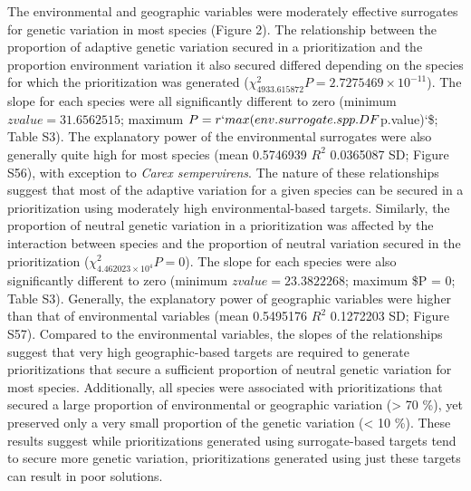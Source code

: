 \documentclass[11pt,]{article}
\begin{document}
The environmental and geographic variables were moderately effective
surrogates for genetic variation in most species (Figure 2). The
relationship between the proportion of adaptive genetic variation
secured in a prioritization and the proportion environment variation it
also secured differed depending on the species for which the
prioritization was generated
(\(\chi^2_{4933.615872} P = 2.7275469\times 10^{-11}\)). The slope for
each species were all significantly different to zero (minimum
\(z value = 31.6562515\); maximum
\(P = r `max(env.surrogate.spp.DF\)p.value)`\$; Table S3). The
explanatory power of the environmental surrogates were also generally
quite high for most species (mean 0.5746939 \(R^2\) 0.0365087 SD; Figure
S56), with exception to \emph{Carex sempervirens}. The nature of these
relationships suggest that most of the adaptive variation for a given
species can be secured in a prioritization using moderately high
environmental-based targets. Similarly, the proportion of neutral
genetic variation in a prioritization was affected by the interaction
between species and the proportion of neutral variation secured in the
prioritization (\(\chi^2_{4.462023\times 10^{4}} P = 0\)). The slope for
each species were also significantly different to zero (minimum
\(z value = 23.3822268\); maximum \$P = 0; Table S3). Generally, the
explanatory power of geographic variables were higher than that of
environmental variables (mean 0.5495176 \(R^2\) 0.1272203 SD; Figure
S57). Compared to the environmental variables, the slopes of the
relationships suggest that very high geographic-based targets are
required to generate prioritizations that secure a sufficient proportion
of neutral genetic variation for most species. Additionally, all species
were associated with prioritizations that secured a large proportion of
environmental or geographic variation (\textgreater{} 70 \%), yet
preserved only a very small proportion of the genetic variation
(\textless{} 10 \%). These results suggest while prioritizations
generated using surrogate-based targets tend to secure more genetic
variation, prioritizations generated using just these targets can result
in poor solutions.
\end{document}
